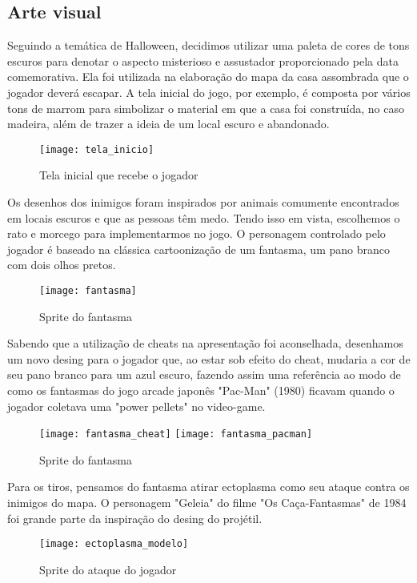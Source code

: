 \documentclass[conference]{IEEEtran}
\begin{document}
\subsection{Arte visual}
Seguindo a temática de Halloween, decidimos utilizar uma paleta de cores de tons escuros para denotar o aspecto misterioso e assustador proporcionado pela data comemorativa. Ela foi utilizada na elaboração do mapa da casa assombrada que o jogador deverá escapar. A tela inicial do jogo, por exemplo, é composta por vários tons de marrom para simbolizar o material em que a casa foi construída, no caso madeira, além de trazer a ideia de um local escuro e abandonado.
\begin{figure}[H]
\centering
\texttt{[image: tela\_inicio]}
\caption{Tela inicial que recebe o jogador}
\end{figure}  

Os desenhos dos inimigos foram inspirados por animais comumente encontrados em locais escuros e que as pessoas têm medo. Tendo isso em vista, escolhemos o rato e morcego para implementarmos no jogo.
O personagem controlado pelo jogador é baseado na clássica cartoonização de um fantasma, um pano branco com dois olhos pretos.

\begin{figure}[h]
\centering
\texttt{[image: fantasma]}
\caption{Sprite do fantasma}
\end{figure}  

Sabendo que a utilização de cheats na apresentação foi aconselhada, desenhamos um novo desing para o jogador que, ao estar sob efeito do cheat, mudaria a cor de seu pano branco para um azul escuro, fazendo assim uma referência ao modo de como os fantasmas do jogo arcade japonês "Pac-Man" (1980)\textsuperscript{\cite{b6}} ficavam quando o jogador coletava uma "power pellets" no video-game.
\begin{figure}[h]
\centering
\texttt{[image: fantasma\_cheat]}
\texttt{[image: fantasma\_pacman]}
\caption{Sprite do fantasma}
\end{figure}  

Para os tiros, pensamos do fantasma atirar ectoplasma como seu ataque contra os inimigos do mapa. O personagem "Geleia" do filme "Os Caça-Fantasmas" de 1984 foi grande parte da inspiração do desing do projétil.

\begin{figure}[H]
\centering
\texttt{[image: ectoplasma\_modelo]}
\caption{Sprite do ataque do jogador}
\end{figure}  
\end{document}
